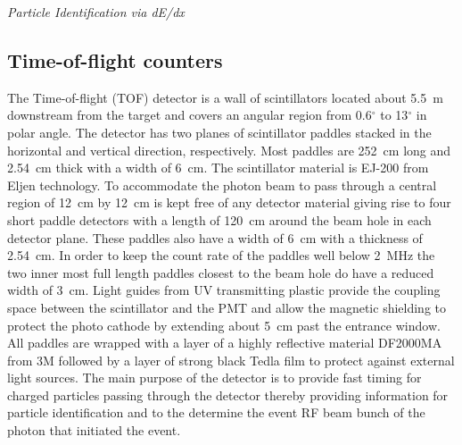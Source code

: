 \smallskip

{\it Particle Identification via dE/dx}

\smallskip

\subsection[Time-of-flight counters (Beni)]{Time-of-flight counters \label{sec:tof}}
The Time-of-flight (TOF) detector is a wall of scintillators located about 5.5~m downstream from the target and covers 
an angular region from 0.6$^{\circ}$ to 13$^{\circ}$ in polar angle. The detector has two planes of
scintillator paddles stacked in the horizontal and vertical direction, respectively. Most paddles are 252~cm long and 2.54~cm
thick with a width of 6~cm. 
The scintillator material is EJ-200 from Eljen technology.
To accommodate the photon beam to pass through a central region of 12~cm by 12~cm is kept
free of any detector material giving rise to four short paddle detectors with a length of 120~cm around the beam hole
in each detector plane. These paddles also have a width of 6~cm with a thickness of 2.54~cm. In order to keep the
count rate of the paddles well below 2~MHz the two inner most full length paddles closest to the beam hole do have a reduced width of 3~cm.
Light guides from UV transmitting plastic provide the coupling space between the scintillator and the PMT and allow the 
magnetic shielding to protect the photo cathode by extending about 5~cm past the entrance window. All paddles are wrapped
with a layer of a highly reflective material DF2000MA from 3M followed by a layer of strong black Tedla film to
protect against external light sources. 
The main purpose of the detector is to provide fast timing for charged particles passing through the detector thereby providing information for particle identification and to the determine the event RF beam bunch of the photon that initiated the event.

